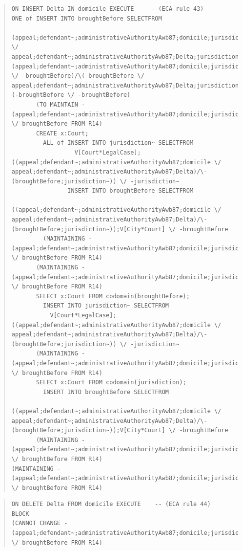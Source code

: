 \documentclass[10pt,a4paper]{report}              %
\theoremstyle{plain}\theorembodyfont{\rmfamily}\newtheorem{definition}{Definition}[section]
\theoremstyle{plain}\theorembodyfont{\rmfamily}\newtheorem{designrule}[definition]{Requirement}
\begin{document}
\begin{quote}
\begin{verbatim}
ON INSERT Delta IN domicile EXECUTE    -- (ECA rule 43)
ONE of INSERT INTO broughtBefore SELECTFROM
         (appeal;defendant~;administrativeAuthorityAwb87;domicile;jurisdiction \/ appeal;defendant~;administrativeAuthorityAwb87;Delta;jurisdiction)/\(appeal;defendant~;administrativeAuthorityAwb87;domicile;jurisdiction \/ -broughtBefore)/\(-broughtBefore \/ appeal;defendant~;administrativeAuthorityAwb87;Delta;jurisdiction)/\(-broughtBefore \/ -broughtBefore)
       (TO MAINTAIN -(appeal;defendant~;administrativeAuthorityAwb87;domicile;jurisdiction) \/ broughtBefore FROM R14)
       CREATE x:Court;
         ALL of INSERT INTO jurisdiction~ SELECTFROM
                  V[Court*LegalCase];((appeal;defendant~;administrativeAuthorityAwb87;domicile \/ appeal;defendant~;administrativeAuthorityAwb87;Delta)/\-(broughtBefore;jurisdiction~)) \/ -jurisdiction~
                INSERT INTO broughtBefore SELECTFROM
                  ((appeal;defendant~;administrativeAuthorityAwb87;domicile \/ appeal;defendant~;administrativeAuthorityAwb87;Delta)/\-(broughtBefore;jurisdiction~));V[City*Court] \/ -broughtBefore
         (MAINTAINING -(appeal;defendant~;administrativeAuthorityAwb87;domicile;jurisdiction) \/ broughtBefore FROM R14)
       (MAINTAINING -(appeal;defendant~;administrativeAuthorityAwb87;domicile;jurisdiction) \/ broughtBefore FROM R14)
       SELECT x:Court FROM codomain(broughtBefore);
         INSERT INTO jurisdiction~ SELECTFROM
           V[Court*LegalCase];((appeal;defendant~;administrativeAuthorityAwb87;domicile \/ appeal;defendant~;administrativeAuthorityAwb87;Delta)/\-(broughtBefore;jurisdiction~)) \/ -jurisdiction~
       (MAINTAINING -(appeal;defendant~;administrativeAuthorityAwb87;domicile;jurisdiction) \/ broughtBefore FROM R14)
       SELECT x:Court FROM codomain(jurisdiction);
         INSERT INTO broughtBefore SELECTFROM
           ((appeal;defendant~;administrativeAuthorityAwb87;domicile \/ appeal;defendant~;administrativeAuthorityAwb87;Delta)/\-(broughtBefore;jurisdiction~));V[City*Court] \/ -broughtBefore
       (MAINTAINING -(appeal;defendant~;administrativeAuthorityAwb87;domicile;jurisdiction) \/ broughtBefore FROM R14)
(MAINTAINING -(appeal;defendant~;administrativeAuthorityAwb87;domicile;jurisdiction) \/ broughtBefore FROM R14)
\end{verbatim}
\end{quote}
\begin{quote}
\begin{verbatim}
ON DELETE Delta FROM domicile EXECUTE    -- (ECA rule 44)
BLOCK
(CANNOT CHANGE -(appeal;defendant~;administrativeAuthorityAwb87;domicile;jurisdiction) \/ broughtBefore FROM R14)
\end{verbatim}
\end{quote}
\end{document}
